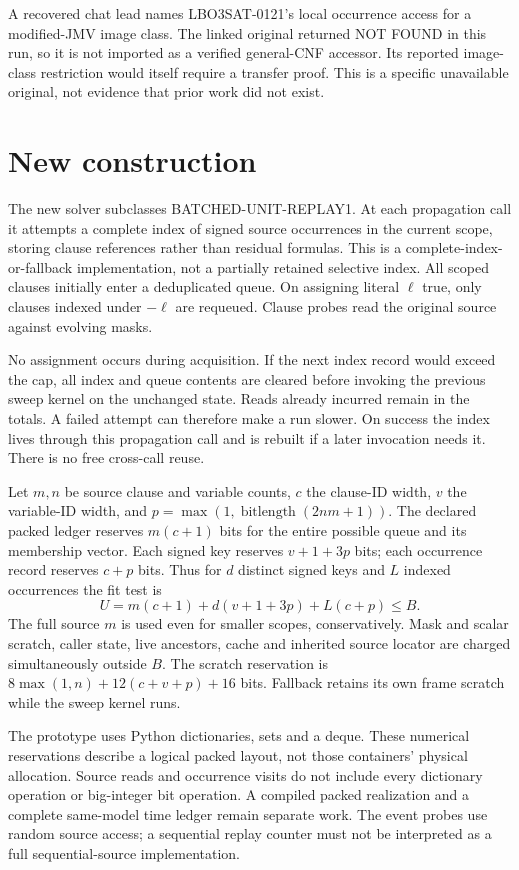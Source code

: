 \documentclass[11pt]{article}
\begin{document}
A recovered chat lead names LBO3SAT-0121's local occurrence access for a
modified-JMV image class. The linked original returned NOT FOUND in this
run, so it is not imported as a verified general-CNF accessor. Its reported
image-class restriction would itself require a transfer proof. This is a
specific unavailable original, not evidence that prior work did not exist.

\section{New construction}
The new solver subclasses BATCHED-UNIT-REPLAY1. At each propagation call
it attempts a complete index of signed source occurrences in the current
scope, storing clause references rather than residual formulas. This is
a complete-index-or-fallback implementation, not a partially retained
selective index. All scoped clauses initially enter a deduplicated queue.
On assigning literal $\ell$ true, only clauses indexed under $-\ell$ are
requeued. Clause probes read the original source against evolving masks.

No assignment occurs during acquisition. If the next index record would
exceed the cap, all index and queue contents are cleared before invoking
the previous sweep kernel on the unchanged state. Reads already incurred
remain in the totals. A failed attempt can therefore make a run slower.
On success the index lives through this propagation call and is rebuilt
if a later invocation needs it. There is no free cross-call reuse.

Let $m,n$ be source clause and variable counts, $c$ the clause-ID width,
$v$ the variable-ID width, and $p=\max(1,\operatorname{bitlength}(2nm+1))$.
The declared packed ledger reserves $m(c+1)$ bits for the entire possible
queue and its membership vector. Each signed key reserves $v+1+3p$ bits;
each occurrence record reserves $c+p$ bits. Thus for $d$ distinct signed
keys and $L$ indexed occurrences the fit test is
\[
 U=m(c+1)+d(v+1+3p)+L(c+p)\le B.
\]
The full source $m$ is used even for smaller scopes, conservatively.
Mask and scalar scratch, caller state, live ancestors, cache and inherited
source locator are charged simultaneously outside $B$. The scratch
reservation is $8\max(1,n)+12(c+v+p)+16$ bits. Fallback retains its own
frame scratch while the sweep kernel runs.

The prototype uses Python dictionaries, sets and a deque. These numerical
reservations describe a logical packed layout, not those containers'
physical allocation. Source reads and occurrence visits do not include
every dictionary operation or big-integer bit operation. A compiled packed
realization and a complete same-model time ledger remain separate work.
The event probes use random source access; a sequential replay counter
must not be interpreted as a full sequential-source implementation.
\end{document}
